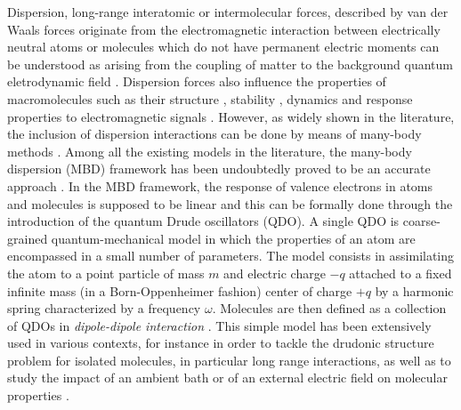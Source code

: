 \documentclass[reprint, amsmath, amssymb, aps, pra]{revtex4-2}
\begin{document}
    Dispersion, long-range interatomic or intermolecular forces, described by van der Waals forces originate from the electromagnetic interaction between electrically neutral atoms or molecules which do not have permanent electric moments \cite{margenau2013theory,kaplan2006intermolecular,stone2013theory,hirschfelder2009intermolecular} can be understood as arising from the coupling of matter to the background quantum eletrodynamic field \cite{casimir1948influence,buhmann2013dispersion,buhmann2007dispersion,compagno1995atom,passante2018dispersion, cohen1997photons,cohen1998atom,bookpreparata,salam2009molecular,craig1998t}. Dispersion forces also influence the properties of macromolecules such as their structure \cite{hoja2019reliable}, stability \cite{hoja2018first,mortazavi2018structure}, dynamics \cite{stohr2019quantum,reilly2014role,galante2021anisotropic} and response properties to electromagnetic signals \cite{kleshchonok2018tailoring, ambrosetti2022optical}. However, as widely shown in the literature, the inclusion of dispersion interactions can be done by means of many-body methods \cite{richardson1975dispersion,mahanty1973dispersion,woods2016materials,tkatchenko2015current,ren2012random,harl2009accurate,dobson2012calculation,parsegian2005van,becke2006simple,becke2006exchange,grimme2010consistent,grimme2006semiempirical,tkatchenko2012accurate,massa2021many}. Among all the existing models in the literature, the many-body dispersion (MBD) framework has been undoubtedly proved to be an accurate approach \cite{tkatchenko2012accurate,ambrosetti2014long}. In the MBD framework, the response of valence electrons in atoms and molecules is supposed to be linear and this can be formally done through the introduction of the quantum Drude oscillators (QDO). A single QDO is coarse-grained quantum-mechanical model in which the properties of an atom are encompassed in a small number of parameters. The model consists in assimilating the atom to a point particle of mass $m$ and electric charge $-q$ attached to a fixed infinite mass (in a Born-Oppenheimer fashion) center of charge $+q$ by a harmonic spring characterized by a frequency $\omega$. Molecules are then defined as a collection of QDOs in \textit{dipole-dipole interaction} \cite{doi:10.1063/1.1743992, doi:10.1063/1.1743991}.
    This simple model has been extensively used in various contexts, for instance in order to tackle the drudonic structure problem for isolated molecules, in particular long range interactions, as well as to study the impact of an ambient bath or of an external electric field on molecular properties \cite{Karimpour_2022, karimpour2021comprehensive}.
\end{document}
